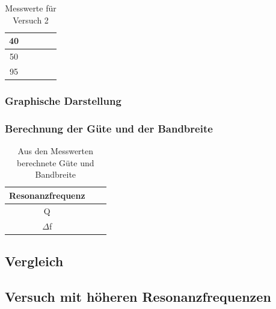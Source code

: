 \documentclass{article}
\begin{document}
\begin{table}[h]
\begin{center}
\begin{tabular}{|c|c|c|c|c|}
      \hline
      40  &                                           &                                          &             &                                   \\
      \hline
      50  &                                           &                                          &             &                                   \\
      \hline
      95  &                                           &                                          &             &                                   \\
      \hline
    \end{tabular}
    \caption{Messwerte für Versuch 2}
    \label{tab:MV2}
  \end{center}
\end{table}

\subsubsection{Graphische Darstellung}

\subsubsection{Berechnung der Güte und der Bandbreite}

\begin{table}[h!]
  \begin{center}
    \begin{tabular}{|c|c|c|}
      \hline
      Resonanzfrequenz &  & \\
      \hline
      Q                &  & \\
      \hline
      $\Delta$f        &  & \\
      \hline
    \end{tabular}
    \caption{Aus den Messwerten berechnete Güte und Bandbreite}
    \label{tab:zMGB}
  \end{center}
\end{table}

\subsection{Vergleich}


\subsection{Versuch mit höheren Resonanzfrequenzen}
\end{document}
